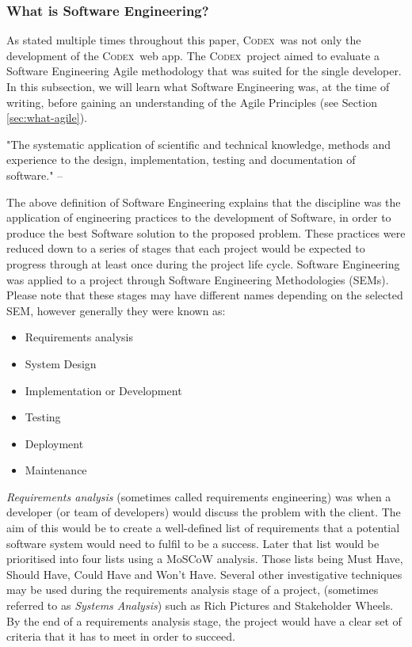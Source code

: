 \documentclass[final]{cmpreport}
\newcommand{\Codex}{\textsc{Codex}}
\begin{document}
			\subsubsection{What is Software Engineering?} \label{sec:what-se}
			As stated multiple times throughout this paper, \Codex \ was not only the development of the \Codex \ web app. The \Codex \ project aimed to evaluate a Software Engineering Agile methodology that was suited for the single developer. In this subsection, we will learn what Software Engineering was, at the time of writing, before gaining an understanding of the Agile Principles (see Section \ref{sec:what-agile}). 
			
			\begin{displayquote}
				"The systematic application of scientific and technical knowledge, methods and experience to the design, implementation, testing and documentation of software." -- \cite{SE-def}
			\end{displayquote}
		
			The above definition of Software Engineering explains that the discipline was the application of engineering practices to the development of Software, in order to produce the best Software solution to the proposed problem. These practices were reduced down to a series of stages that each project would be expected to progress through at least once during the project life cycle. Software Engineering was applied to a project through Software Engineering Methodologies (SEMs). Please note that these stages may have different names depending on the selected SEM, however generally they were known as:
			
			\begin{itemize}
				\item Requirements analysis
				\item System Design
				\item Implementation or Development
				\item Testing
				\item Deployment
				\item Maintenance				
			\end{itemize}
		
			\emph{Requirements analysis} (sometimes called requirements engineering) was when a developer (or team of developers) would discuss the problem with the client. The aim of this would be to create a well-defined list of requirements that a potential software system would need to fulfil to be a success. Later that list would be prioritised into four lists using a MoSCoW analysis. Those lists being Must Have, Should Have, Could Have and Won't Have. Several other investigative techniques may be used during the requirements analysis stage of a project, (sometimes referred to as \emph{Systems Analysis}) such as Rich Pictures and Stakeholder Wheels. By the end of a requirements analysis stage, the project would have a clear set of criteria that it has to meet in order to succeed.
			
\end{document}
